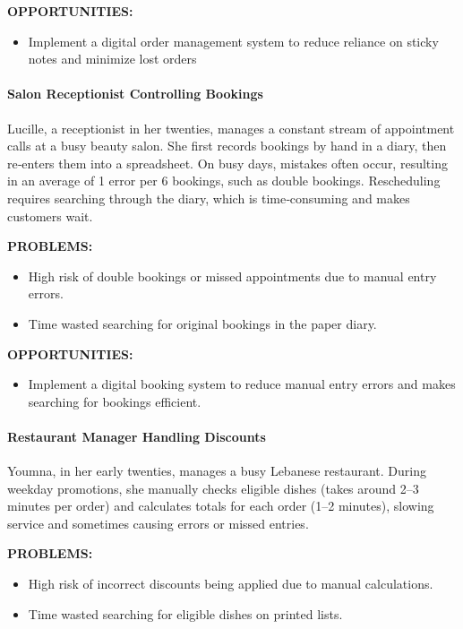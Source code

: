 \documentclass[]{VUMIFTemplateClass}
\newcommand{\todocomment}[1]{%
    \begin{tcolorbox}[colback=red!20, colframe=red!60, arc=0pt, outer arc=0pt, boxrule=1pt, left=3pt, right=3pt, top=3pt, bottom=3pt]
        \textbf{\textcolor{orange!70!black}{TODO:}} #1
    \end{tcolorbox}
}
\newcommand{\subsubsubsection}[1]{\paragraph{#1}}
\begin{document}
\textbf{OPPORTUNITIES:}

\begin{itemize}
    \item Implement a digital order management system to reduce reliance on sticky notes and minimize lost orders
\end{itemize}


\subsubsubsection{Salon Receptionist Controlling Bookings}
\label{subsubsubsec:salon-receptionist}

Lucille, a receptionist in her twenties, manages a constant stream of appointment calls at a busy beauty salon. She first records bookings by hand in a diary, then re‑enters them into a spreadsheet. On busy days, mistakes often occur, resulting in an average of 1 error per 6 bookings, such as double bookings. Rescheduling requires searching through the diary, which is time‑consuming and makes customers wait. 


\textbf{PROBLEMS:}

\begin{itemize}
    \item High risk of double bookings or missed appointments due to manual entry errors.
    \item Time wasted searching for original bookings in the paper diary.
\end{itemize}

\textbf{OPPORTUNITIES:}
\begin{itemize}
    \item Implement a digital booking system to reduce manual entry errors and
    makes searching for bookings efficient.
\end{itemize}


\subsubsubsection{Restaurant Manager Handling Discounts}
\label{subsubsubsec:restaurant-discounts}

Youmna, in her early twenties, manages a busy Lebanese restaurant. During weekday promotions, she manually checks eligible dishes (takes around 2–3 minutes per order) and calculates totals for each order (1–2 minutes), slowing service and sometimes causing errors or missed entries.

\textbf{PROBLEMS:}

\begin{itemize}
    \item High risk of incorrect discounts being applied due to manual calculations.
    \item Time wasted searching for eligible dishes on printed lists.
\end{itemize}
\end{document}
